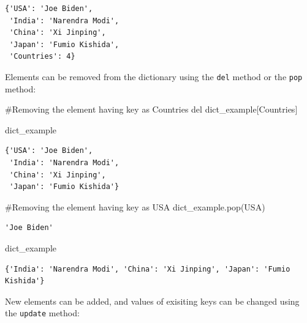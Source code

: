 \documentclass[
  letterpaper,
  DIV=11,
  numbers=noendperiod]{scrreprt}
\newenvironment{Shaded}{\begin{snugshade}}{\end{snugshade}}
\newcommand{\CommentTok}[1]{\textcolor[rgb]{0.37,0.37,0.37}{#1}}
\newcommand{\KeywordTok}[1]{\textcolor[rgb]{0.00,0.23,0.31}{#1}}
\newcommand{\NormalTok}[1]{\textcolor[rgb]{0.00,0.23,0.31}{#1}}
\newcommand{\StringTok}[1]{\textcolor[rgb]{0.13,0.47,0.30}{#1}}
\begin{document}
\begin{verbatim}
{'USA': 'Joe Biden',
 'India': 'Narendra Modi',
 'China': 'Xi Jinping',
 'Japan': 'Fumio Kishida',
 'Countries': 4}
\end{verbatim}

Elements can be removed from the dictionary using the \texttt{del}
method or the \texttt{pop} method:

\begin{Shaded}
\begin{Highlighting}[]
\CommentTok{\#Removing the element having key as \textquotesingle{}Countries\textquotesingle{}}
\KeywordTok{del}\NormalTok{ dict\_example[}\StringTok{\textquotesingle{}Countries\textquotesingle{}}\NormalTok{]}
\end{Highlighting}
\end{Shaded}

\begin{Shaded}
\begin{Highlighting}[]
\NormalTok{dict\_example}
\end{Highlighting}
\end{Shaded}

\begin{verbatim}
{'USA': 'Joe Biden',
 'India': 'Narendra Modi',
 'China': 'Xi Jinping',
 'Japan': 'Fumio Kishida'}
\end{verbatim}

\begin{Shaded}
\begin{Highlighting}[]
\CommentTok{\#Removing the element having key as \textquotesingle{}USA\textquotesingle{}}
\NormalTok{dict\_example.pop(}\StringTok{\textquotesingle{}USA\textquotesingle{}}\NormalTok{)}
\end{Highlighting}
\end{Shaded}

\begin{verbatim}
'Joe Biden'
\end{verbatim}

\begin{Shaded}
\begin{Highlighting}[]
\NormalTok{dict\_example}
\end{Highlighting}
\end{Shaded}

\begin{verbatim}
{'India': 'Narendra Modi', 'China': 'Xi Jinping', 'Japan': 'Fumio Kishida'}
\end{verbatim}

New elements can be added, and values of exisiting keys can be changed
using the \texttt{update} method:
\end{document}
